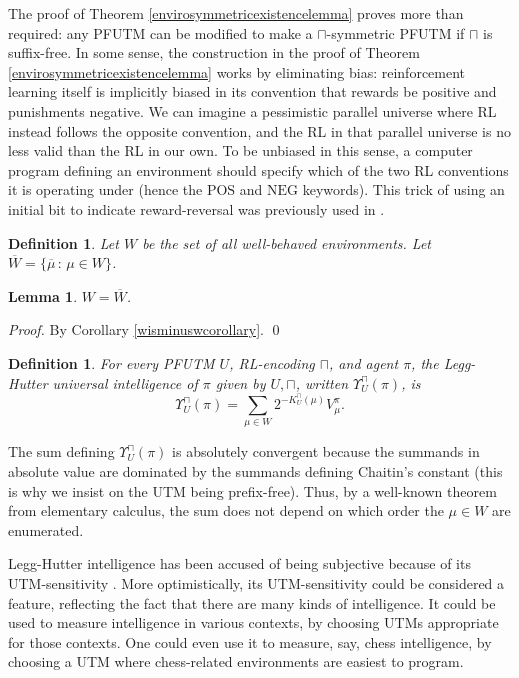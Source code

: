 \documentclass[runningheads]{llncs}
\newtheorem{mydefinition}[mytheorem]{Definition}
\newtheorem{mylemma}[mytheorem]{Lemma}
\def\LH{\Upsilon}
\begin{document}
The proof of Theorem \ref{envirosymmetricexistencelemma} proves more than required:
any PFUTM can be modified to make a $\sqcap$-symmetric PFUTM
if $\sqcap$ is suffix-free. In some sense,
the construction in the proof of Theorem \ref{envirosymmetricexistencelemma} works
by eliminating bias: reinforcement learning itself is implicitly biased in its
convention that rewards be positive and punishments negative. We can imagine
a pessimistic parallel universe
where RL instead follows the opposite convention, and the
RL in that parallel universe is no less valid than the RL in our own. To be
unbiased in this sense, a computer program defining an environment
should specify which of the two RL conventions it is operating under (hence the
$\mathrm{POS}$ and $\mathrm{NEG}$ keywords). This trick of using an initial bit
to indicate reward-reversal was previously used in \cite{legg2013approximation}.

\begin{mydefinition}
    Let $W$ be the set of all well-behaved environments.
    Let $\overline W=\{\overline\mu\,:\,\mu\in W\}$.
\end{mydefinition}

\begin{mylemma}
\label{WequalsminusWlemma}
$W=\overline W$.
\end{mylemma}

\begin{proof}
    By Corollary \ref{wisminuswcorollary}.
    \qed
\end{proof}

\begin{mydefinition}
\label{universalintelligencedefn}
For every PFUTM $U$, RL-encoding $\sqcap$, and agent $\pi$,
the \emph{Legg-Hutter universal intelligence of $\pi$ given
by $U,\sqcap$}, written $\LH^\sqcap_U(\pi)$, is
\[
    \LH^\sqcap_U(\pi) = \sum_{\mu \in W} 2^{-K^\sqcap_U(\mu)}V^\pi_\mu.
\]
\end{mydefinition}

The sum defining $\LH^\sqcap_U(\pi)$ is absolutely convergent because the summands
in absolute value are dominated by the summands defining Chaitin's constant
(this is why we insist on the UTM being prefix-free).
Thus, by a well-known
theorem from elementary calculus, the sum does not depend on which order the $\mu\in W$
are enumerated.

Legg-Hutter intelligence has been accused of being subjective
because of its
UTM-sensitivity \cite{leike2015bad} \cite{hernandez2015c} \cite{hibbard2009bias}.
More optimistically,
its UTM-sensitivity could be considered a feature, reflecting the fact
that there are many kinds of intelligence. It could be used to measure
intelligence in various contexts, by choosing UTMs appropriate for those
contexts. One could even use it to measure, say, chess intelligence,
by choosing a UTM where chess-related environments are easiest to program.
\end{document}
